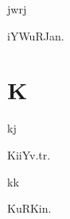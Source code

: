 \begin{multicols*}{2}
\begin{dictroot}{jw}{rj}
    \begin{dictentry}{iYWuRJa}{n.}
    \end{dictentry}
\end{dictroot}

\section*{K}

\begin{dictroot}{k}{j}
    \begin{dictentry}{KiiY}{v.tr.}
    \end{dictentry}
\end{dictroot}

\begin{dictroot}{k}{k}
    \begin{dictentry}{KuRKi}{n.}
    \end{dictentry}
\end{dictroot}


\end{multicols*}
